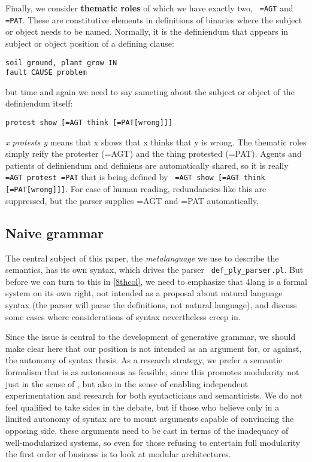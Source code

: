 \documentclass[11pt,bookmarks,bookmarksnumbered,naturalnames,plainpages=false,pdftex,colorlinks=true,urlcolor=blue,bookmarksdepth=subsection,plainpages=false]{paper}
\begin{document}
\bigskip
Finally, we consider {\bf thematic roles} of which we have exactly two, {\tt
  =AGT} and {\tt =PAT}. These are constitutive elements in definitions of
binaries where the subject or object needs to be named. Normally, it is the
definiendum that appears in subject or object position of a defining clause:

\begin{verbatim}
soil ground, plant grow IN
fault CAUSE problem
\end{verbatim}

\noindent
but time and again we need to say sameting about the subject or object of the
definiendum itself: 

\begin{verbatim}
protest show [=AGT think [=PAT[wrong]]]
\end{verbatim}

\noindent
{\it x protests y} means that x shows that x thinks that y is wrong. The
thematic roles simply reify the protester (=AGT) and the thing protested
(=PAT). Agents and patients of definiendum and definiens are automatically
shared, so it is really {\tt =AGT protest =PAT} that is being defined by {\tt
  =AGT show [=AGT think [=PAT[wrong]]]}. For ease of human reading,
redundancies like this are suppressed, but the parser supplies =AGT and =PAT
automatically, 

\subsection{Naive grammar}\label{naivegrammar}

The central subject of this paper, the {\it metalanguage} we use to describe
the semantics, has its own syntax, which drives the parser {\tt
  def\_ply\_parser.pl}. But before we can turn to this in \ref{8thcol}, we need
to emphasize that 4lang is a formal system on its own right, not intended as a
proposal about natural language syntax (the parser will parse the definitions,
not natural language), and discuss some cases where considerations of syntax
nevertheless creep in.

Since the issue is central to the development of generative grammar, we should
make clear here that our position is not intended as an argument for, or
against, the autonomy of syntax thesis. As a research strategy, we prefer a
semantic formalism that is as autonomous as feasible, since this promotes
modularity not just in the sense of \cite{Fodor:1983}, but also in the sense
of enabling independent experimentation and research for both syntacticians
and semanticists. We do not feel qualified to take sides in the debate, but if
those who believe only in a limited autonomy of syntax are to mount arguments
capable of convincing the opposing side, these arguments need to be cast in
terms of the inadequacy of well-modularized systems, so even for those
refusing to entertain full modularity the first order of business is to look
at modular architectures.
\end{document}
